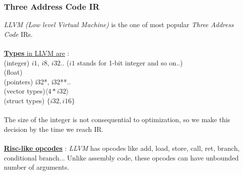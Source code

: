 \subsubsection{Three Address Code IR}
\textit{LLVM (Low level Virtual Machine)} is the one of most popular \emph{Three Address Code} IRs.\\ \\
 \underline{\textbf{Types} in LLVM are} : \\
 (integer) $i1$, $i8$, $i32$.. ($i1$ stands for 1-bit integer and so on..) \\
 (float)\\
 (pointers) i32*, i32**..\\
 (vector types)$\langle4 * i32\rangle$\\
 (struct types) $\{i32, i16\}$
  \\ \\
The size of the integer is not consequential to optimization, so we make this decision by the time we reach IR. \\ \\
\underline{\textbf{Risc-like opcodes}} : \textit{LLVM} has opcodes like add, load, store, call, ret, branch, conditional branch...
Unlike assembly code, these opcodes can have unbounded number of arguments.